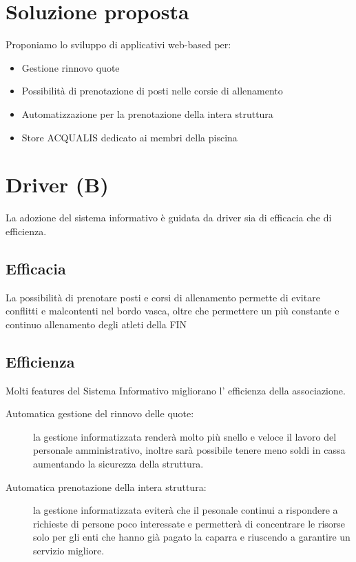 \documentclass[11pt]{article} %
\begin{document}
\section{Soluzione proposta}

Proponiamo lo sviluppo di applicativi web-based per:

\begin{itemize}
	\item Gestione rinnovo quote
	\item Possibilità di prenotazione di posti nelle corsie di allenamento
	\item Automatizzazione per la prenotazione della intera struttura
	\item Store ACQUALIS dedicato ai membri della piscina
\end{itemize}

\section{Driver (B)}

La adozione del sistema informativo è guidata da driver sia di efficacia che di efficienza.

\subsection{Efficacia}

La possibilità di prenotare posti e corsi di allenamento permette di evitare conflitti e malcontenti nel bordo vasca, oltre che permettere un più constante e continuo allenamento degli atleti della FIN

\subsection{Efficienza}

Molti features del Sistema Informativo migliorano l' efficienza della associazione.

\begin{description}
	\item[Automatica gestione del rinnovo delle quote:] la gestione informatizzata renderà molto più snello e veloce il lavoro del personale amministrativo, inoltre sarà possibile tenere meno soldi in cassa aumentando la sicurezza della struttura. 
	\item[Automatica prenotazione della intera struttura:] la gestione informatizzata eviterà che il pesonale continui a rispondere a richieste di persone poco interessate e permetterà di concentrare le risorse solo per gli enti che hanno già pagato la caparra e riuscendo a garantire un servizio migliore.
\end{description}
\end{document}
